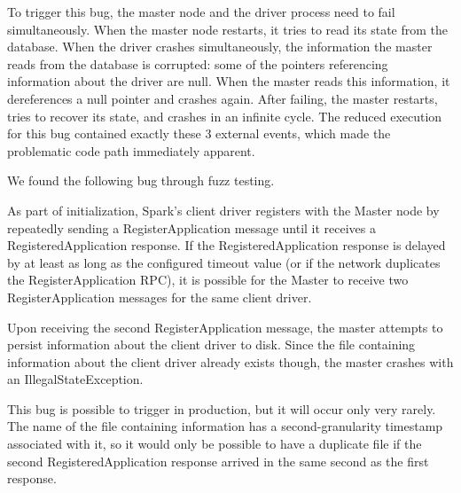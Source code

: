 To trigger this bug, the master node and the driver process need to fail
simultaneously. When the master node restarts, it tries to read its state from
the database. When the driver crashes simultaneously, the
information the master reads from the database is corrupted: some of
the pointers referencing information about the driver are null. When the
master reads this information, it dereferences a null pointer and crashes
again. After failing, the master restarts, tries to recover its state, and
crashes in an infinite cycle. The reduced execution for this bug contained
exactly these 3 external events, which made the problematic code path immediately apparent.

 We found the
following bug through fuzz testing.

As part of
initialization, Spark's client driver registers with the Master node by repeatedly sending a RegisterApplication
  message until it receives a RegisteredApplication response.
 If the RegisteredApplication response is delayed by at least as long as the
 configured timeout value (or if the network
  duplicates the RegisterApplication RPC), it is possible for the Master to receive two RegisterApplication
  messages for the same client driver.

Upon receiving the second RegisterApplication message, the master attempts to
persist information about the client driver
to disk. Since the file containing information about the client driver already exists though, the master crashes with an
IllegalStateException.

This bug is possible to trigger in production, but it will occur only very
rarely. The name of the file containing information has a second-granularity timestamp associated
with it, so it would only be possible to have a duplicate file if the second
RegisteredApplication response arrived in the same second as the first
response.

